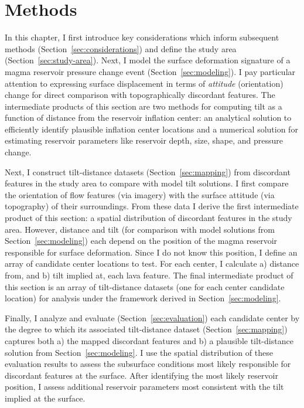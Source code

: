 \chapter{Methods}\label{cha:methods}

In this chapter, I first introduce key considerations which inform subsequent methods (Section~\ref{sec:considerations}) and define the study area (Section~\ref{sec:study-area}). Next, I model the surface deformation signature of a magma reservoir pressure change event (Section~\ref{sec:modeling}). I pay particular attention to expressing surface displacement in terms of \emph{attitude} (orientation) change for direct comparison with topographically discordant features. The intermediate products of this section are two methods for computing tilt as a function of distance from the reservoir inflation center: an analytical solution to efficiently identify plausible inflation center locations and a numerical solution for estimating reservoir parameters like reservoir depth, size, shape, and pressure change.

Next, I construct tilt-distance datasets (Section~\ref{sec:mapping}) from discordant features in the study area to compare with model tilt solutions. I first compare the orientation of flow features (via imagery) with the surface attitude (via topography) of their surroundings. From these data I derive the first intermediate product of this section: a spatial distribution of discordant features in the study area. However, distance and tilt (for comparison with model solutions from Section~\ref{sec:modeling}) each depend on the position of the magma reservoir responsible for surface deformation. Since I do not know this position, I define an array of candidate center locations to test. For each center, I calculate a) distance from, and b) tilt implied at, each lava feature. The final intermediate product of this section is an array of tilt-distance datasets (one for each center candidate location) for analysis under the framework derived in Section~\ref{sec:modeling}.

Finally, I analyze and evaluate (Section~\ref{sec:evaluation}) each candidate center by the degree to which its associated tilt-distance dataset (Section~\ref{sec:mapping}) captures both a) the mapped discordant features and b) a plausible tilt-distance solution from Section~\ref{sec:modeling}. I use the spatial distribution of these evaluation results to assess the subsurface conditions most likely responsible for discordant features at the surface. After identifying the most likely reservoir position, I assess additional reservoir parameters most consistent with the tilt implied at the surface.

